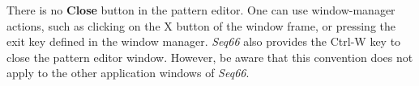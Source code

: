    There is no \textbf{Close} button in the pattern editor.  One can use
   window-manager actions, such as clicking on the X button of the window
   frame, or pressing the exit key defined in the window manager.
   \textsl{Seq66} also provides the Ctrl-W key to close the pattern
   editor window.
   However, be aware that this convention does not apply to the other
   application windows of \textsl{Seq66}.

